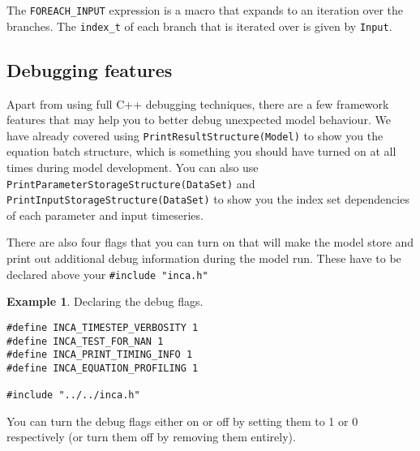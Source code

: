 \documentclass[11pt]{article}
\theoremstyle{definition}
\newtheorem{myexample}{Example}
\newenvironment{example}%
  {\begin{lrbox}{\examplebox}%
   \begin{minipage}{\dimexpr\linewidth-2\fboxsep}
   \begin{myexample}}%
  {\end{myexample}%
   \end{minipage}%
   \end{lrbox}%
   \begin{trivlist}
     \item[]\colorbox{silver}{\usebox\examplebox}
   \end{trivlist}}
\begin{document}
The {\tt FOREACH\_INPUT} expression is a macro that expands to an iteration over the branches. The {\tt index\_t} of each branch that is iterated over is given by {\tt *Input}.

\subsection{Debugging features}

Apart from using full C++ debugging techniques, there are a few framework features that may help you to better debug unexpected model behaviour. We have already covered using {\tt PrintResultStructure(Model)} to show you the equation batch structure, which is something you should have turned on at all times during model development. You can also use {\tt PrintParameterStorageStructure(DataSet)} and {\tt PrintInputStorageStructure(DataSet)} to show you the index set dependencies of each parameter and input timeseries.

There are also four flags that you can turn on that will make the model store and print out additional debug information during the model run. These have to be declared above your {\tt \#include "inca.h"}

\begin{example}
Declaring the debug flags.
\begin{lstlisting}[style=mycpp]
#define INCA_TIMESTEP_VERBOSITY 1
#define INCA_TEST_FOR_NAN 1
#define INCA_PRINT_TIMING_INFO 1
#define INCA_EQUATION_PROFILING 1

#include "../../inca.h"
\end{lstlisting}
\end{example}

You can turn the debug flags either on or off by setting them to 1 or 0 respectively (or turn them off by removing them entirely).
\end{document}
